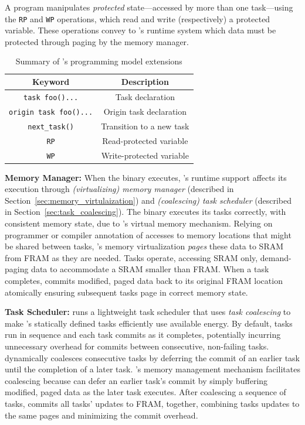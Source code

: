 A \sys program manipulates {\em protected} state---accessed by more than one task---using the {\tt RP} and {\tt WP} operations, which read and write (respectively) a protected variable. These operations convey to \sys's runtime system which data must be protected through paging by the memory manager.   

\begin{table}
	\centering
	\footnotesize
	\begin{tabular}{|c|c|}
		\hline
		Keyword & Description\\
		\hline\hline
		\texttt{task foo(){...}} & Task declaration\\
		\texttt{origin task foo(){...}} & Origin task declaration\\
		\texttt{next\_task()} & Transition to a new task\\
		\texttt{RP} & Read-protected variable\\
		\texttt{WP} & Write-protected variable\\
		\hline
	\end{tabular}
	\caption{Summary of \sys's programming model extensions}
	\label{tab:viper_syntax}
\end{table}

\noindent \textbf{\sys Memory Manager:} When the binary executes, \sys's runtime support affects its execution through {\em (virtualizing) memory manager} (described in Section~\ref{sec:memory_virtulaization}) and {\em (coalescing) task scheduler} (described in Section~\ref{sec:task_coalescing}). The \sys binary executes its tasks correctly, with consistent memory state, due to \sys's virtual memory mechanism. Relying on programmer or compiler annotation of accesses to memory locations that might be shared between tasks, \sys's memory virtualization {\em pages} these data to SRAM from FRAM as they are needed. Tasks operate, accessing SRAM only, demand-paging data to accommodate a SRAM smaller than FRAM. When a task completes, \sys commits modified, paged data back to its original FRAM location atomically ensuring subsequent tasks page in correct memory state. 

\noindent \textbf{\sys Task Scheduler:} \sys runs a lightweight task scheduler that uses {\em task coalescing} to make \sys's statically defined tasks efficiently use available energy. By default, tasks run in sequence and each task commits as it completes, potentially incurring unnecessary overhead for commits between consecutive, non-failing tasks. \sys dynamically coalesces consecutive tasks by deferring the commit of an earlier task until the completion of a later task. \sys's memory management mechanism facilitates coalescing because \sys can defer an earlier task's commit by simply buffering modified, paged data as the later task executes. After coalescing a sequence of tasks, \sys commits all tasks' updates to FRAM, together, combining tasks updates to the same pages and minimizing the commit overhead.